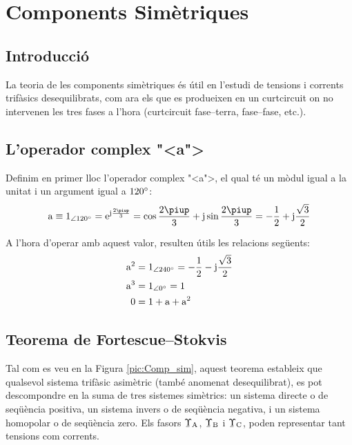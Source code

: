 \chapter{Components Sim\`{e}triques}  \label{sec:comp-sim}

\section{Introducci\'{o}}
La teoria de les components sim\`{e}triques \'{e}s \'{u}til en l'estudi de
tensions i corrents trif\`{a}sics
 desequilibrats, com ara els que es produeixen en un curtcircuit on no intervenen les tres
 fases a l'hora (curtcircuit fase--terra, fase--fase, etc.).

\section{L'operador complex {"<}a{">}}

Definim en primer lloc l'operador complex {"<}a{">}, el qual t\'{e} un m\`{o}dul
igual a la unitat i un argument igual a $120^\circ$: 
\begin{equation}
   \au \equiv \numpd{1}{120} = \eu^{\ju\frac{2\piup}{3}} =
   \cos \frac{2\piup}{3} + \ju \sin \frac{2\piup}{3} = - \frac{1}{2} + \ju \frac{\sqrt{3}}{2}
\end{equation}

A l'hora d'operar amb aquest valor, resulten \'{u}tils les relacions
seg\"{u}ents:
\begin{subequations}
\begin{align}
    \mathrm{a}^2 &= \num{1}_{\angle\ang{240}}= - \frac{1}{2} - \mathrm{j} \frac{\sqrt{3}}{2} \\
    \mathrm{a}^3 &= \num{1}_{\angle\ang{0}} = 1 \\
    0 &= 1+ \mathrm{a} + \mathrm{a}^2
 \end{align}
\end{subequations}

\section{\texorpdfstring{Teorema de Fortescue--Stokvis}{Teorema de Fortescue-Stokvis}}

Tal com es veu en la Figura \vref{pic:Comp_sim}, aquest teorema
estableix que qualsevol sistema trif\`{a}sic asim\`{e}tric (tamb\'{e} anomenat
desequilibrat),  es pot descompondre  en la suma de tres sistemes
sim\`{e}trics: un sistema directe o de seq\"{u}\`{e}ncia positiva, un sistema
invers o de seq\"{u}\`{e}ncia negativa, i un sistema homopolar o de
seq\"{u}\`{e}ncia zero. Els fasors $\cmplx{\Upsilon}\ped{A}$,
$\cmplx{\Upsilon}\ped{B}$ i $\cmplx{\Upsilon}\ped{C}$, poden representar tant
tensions com corrents.

